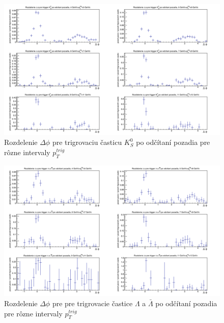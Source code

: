 \documentclass[thesismargins, thesislinespacing]{rnthesis}
\begin{document}
\begin{figure}[hbtp!]
	\centering
	\includegraphics[width=\textwidth]{./Obrazky_praca/DeltaPhiKH.png}
	\caption{Rozdelenie $\Delta \phi$ pre trigrovaciu časticu $K^0_S$ po odčítaní pozadia pre rôzne intervaly $p_T^{trig}$}
	\label{K0}
\end{figure}

\begin{figure}[hbtp!]
	\centering
	\includegraphics[width=\textwidth]{./Obrazky_praca/DeltaPhiLH.png}
	\caption{Rozdelenie $\Delta \phi$ pre pre trigrovacie častice $\Lambda$ a $\bar{\Lambda}$  po odčítaní pozadia pre rôzne intervaly $p_T^{trig}$}
	\label{lambda}
\end{figure}
\end{document}
